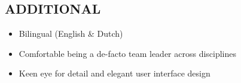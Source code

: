 \documentclass[margin]{res}
\begin{document}
\begin{resume}
\section{ADDITIONAL} %
  \begin{itemize}
    \item Bilingual (English \& Dutch)
    \item Comfortable being a de-facto team leader across disciplines
    \item Keen eye for detail and elegant user interface design
  \end{itemize}

\end{resume}
\end{document}

